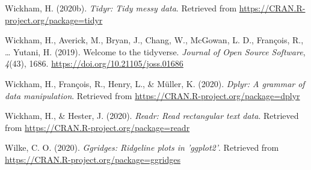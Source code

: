 \documentclass[
  english,
  man]{apa6}
\newlength{\cslhangindent}
\newenvironment{cslreferences}%
  {\setlength{\parindent}{0pt}%
  \everypar{\setlength{\hangindent}{\cslhangindent}}\ignorespaces}%
  {\par}
\begin{document}
\begin{cslreferences}
\leavevmode\hypertarget{ref-R-tidyr}{}%
Wickham, H. (2020b). \emph{Tidyr: Tidy messy data}. Retrieved from \url{https://CRAN.R-project.org/package=tidyr}

\leavevmode\hypertarget{ref-R-tidyverse}{}%
Wickham, H., Averick, M., Bryan, J., Chang, W., McGowan, L. D., François, R., \ldots{} Yutani, H. (2019). Welcome to the tidyverse. \emph{Journal of Open Source Software}, \emph{4}(43), 1686. \url{https://doi.org/10.21105/joss.01686}

\leavevmode\hypertarget{ref-R-dplyr}{}%
Wickham, H., François, R., Henry, L., \& Müller, K. (2020). \emph{Dplyr: A grammar of data manipulation}. Retrieved from \url{https://CRAN.R-project.org/package=dplyr}

\leavevmode\hypertarget{ref-R-readr}{}%
Wickham, H., \& Hester, J. (2020). \emph{Readr: Read rectangular text data}. Retrieved from \url{https://CRAN.R-project.org/package=readr}

\leavevmode\hypertarget{ref-R-ggridges}{}%
Wilke, C. O. (2020). \emph{Ggridges: Ridgeline plots in 'ggplot2'}. Retrieved from \url{https://CRAN.R-project.org/package=ggridges}
\end{cslreferences}

\endgroup
\end{document}
